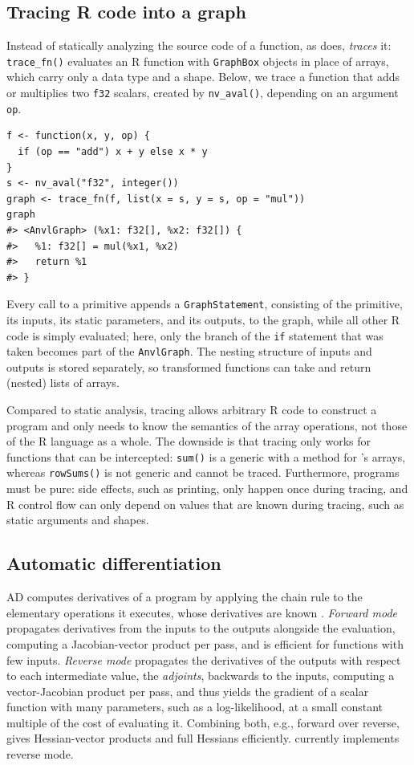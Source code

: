 \subsection{Tracing R code into a graph}\label{trace}

Instead of statically analyzing the source code of a function, as  does,  \emph{traces} it: \texttt{trace\_fn()} evaluates an R function with \texttt{GraphBox} objects in place of arrays, which carry only a data type and a shape.
Below, we trace a function that adds or multiplies two \texttt{f32} scalars, created by \texttt{nv\_aval()}, depending on an argument \texttt{op}.

\begin{verbatim}
f <- function(x, y, op) {
  if (op == "add") x + y else x * y
}
s <- nv_aval("f32", integer())
graph <- trace_fn(f, list(x = s, y = s, op = "mul"))
graph
#> <AnvlGraph> (%x1: f32[], %x2: f32[]) {
#>   %1: f32[] = mul(%x1, %x2)
#>   return %1
#> }
\end{verbatim}

Every call to a primitive appends a \texttt{GraphStatement}, consisting of the primitive, its inputs, its static parameters, and its outputs, to the graph, while all other R code is simply evaluated; here, only the branch of the \texttt{if} statement that was taken becomes part of the \texttt{AnvlGraph}.
The nesting structure of inputs and outputs is stored separately, so transformed functions can take and return (nested) lists of arrays.

Compared to static analysis, tracing allows arbitrary R code to construct a program and only needs to know the semantics of the array operations, not those of the R language as a whole.
The downside is that tracing only works for functions that can be intercepted: \texttt{sum()} is a generic with a method for 's arrays, whereas \texttt{rowSums()} is not generic and cannot be traced.
Furthermore, programs must be pure: side effects, such as printing, only happen once during tracing, and R control flow can only depend on values that are known during tracing, such as static arguments and shapes.

\subsection{Automatic differentiation}\label{ad}

AD computes derivatives of a program by applying the chain rule to the elementary operations it executes, whose derivatives are known \citep{ref-griewank2008evaluating}.
\emph{Forward mode} propagates derivatives from the inputs to the outputs alongside the evaluation, computing a Jacobian-vector product per pass, and is efficient for functions with few inputs.
\emph{Reverse mode} propagates the derivatives of the outputs with respect to each intermediate value, the \emph{adjoints}, backwards to the inputs, computing a vector-Jacobian product per pass, and thus yields the gradient of a scalar function with many parameters, such as a log-likelihood, at a small constant multiple of the cost of evaluating it.
Combining both, e.g., forward over reverse, gives Hessian-vector products and full Hessians efficiently.
 currently implements reverse mode.

